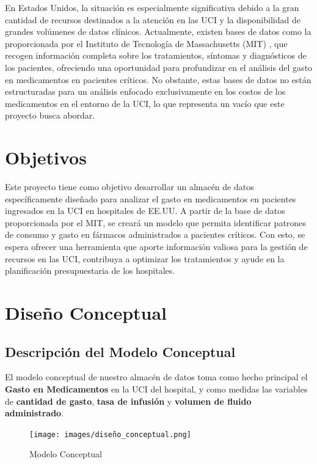 \documentclass{article}
\begin{document}
En Estados Unidos, la situación es especialmente significativa debido a la gran cantidad de recursos destinados a la atención en las UCI y la disponibilidad de grandes volúmenes de datos clínicos. Actualmente, existen bases de datos como la proporcionada por el Instituto de Tecnología de Massachusetts (MIT) \cite{eicu_crd}, que recogen información completa sobre los tratamientos, síntomas y diagnósticos de los pacientes, ofreciendo una oportunidad para profundizar en el análisis del gasto en medicamentos en pacientes críticos. No obstante, estas bases de datos no están estructuradas para un análisis enfocado exclusivamente en los costos de los medicamentos en el entorno de la UCI, lo que representa un vacío que este proyecto busca abordar.

\section{Objetivos}
\label{sec:objetivos}

Este proyecto tiene como objetivo desarrollar un almacén de datos específicamente diseñado para analizar el gasto en medicamentos en pacientes ingresados en la UCI en hospitales de EE.UU. A partir de la base de datos proporcionada por el MIT, se creará un modelo que permita identificar patrones de consumo y gasto en fármacos administrados a pacientes críticos. Con esto, se espera ofrecer una herramienta que aporte información valiosa para la gestión de recursos en las UCI, contribuya a optimizar los tratamientos y ayude en la planificación presupuestaria de los hospitales.

\section{Diseño Conceptual}
\label{sec:diseno_conceptual}

\subsection{Descripción del Modelo Conceptual}

El modelo conceptual de nuestro almacén de datos toma como hecho principal el \textbf{Gasto en Medicamentos} en la UCI del hospital, y como medidas las variables de \textbf{cantidad de gasto}, \textbf{tasa de infusión} y \textbf{volumen de fluido administrado}.

\begin{figure}[H]
	\centering
	\texttt{[image: images/diseño\_conceptual.png]}
	\caption{Modelo Conceptual}
	\label{fig:conceptual}
\end{figure}
\end{document}
